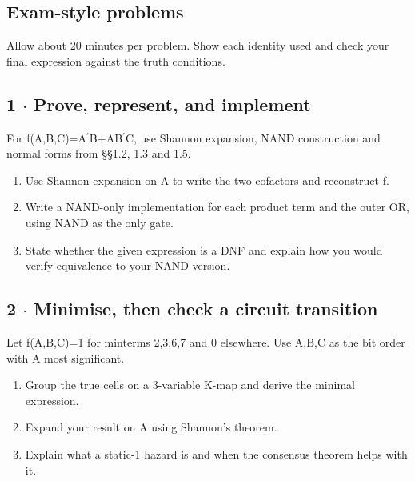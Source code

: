 \documentclass[11pt]{article}
\begin{document}
\begin{keepsection}
\section{Exam-style problems}

Allow about 20 minutes per problem. Show each identity used and check your final expression against the truth conditions.

\begin{keepsection}
\subsection{1 \ensuremath{\cdot} Prove, represent, and implement}

For f(A,B,C)=A\ensuremath{{}^{\prime}}B+AB\ensuremath{{}^{\prime}}C, use Shannon expansion, NAND construction and normal forms from §§1.2, 1.3 and 1.5.

\begin{enumerate}
\item Use Shannon expansion on A to write the two cofactors and reconstruct f.
\item Write a NAND-only implementation for each product term and the outer OR, using NAND as the only gate.
\item State whether the given expression is a DNF and explain how you would verify equivalence to your NAND version.
\end{enumerate}

\end{keepsection}

\begin{keepsection}
\subsection{2 \ensuremath{\cdot} Minimise, then check a circuit transition}

Let f(A,B,C)=1 for minterms 2,3,6,7 and 0 elsewhere. Use A,B,C as the bit order with A most significant.

\begin{enumerate}
\item Group the true cells on a 3-variable K-map and derive the minimal expression.
\item Expand your result on A using Shannon’s theorem.
\item Explain what a static-1 hazard is and when the consensus theorem helps with it.
\end{enumerate}

\end{keepsection}
\end{keepsection}
\end{document}
